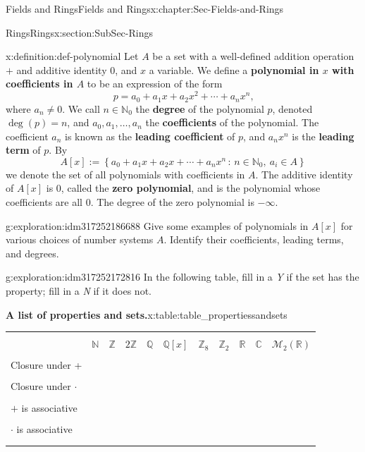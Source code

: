 \documentclass[oneside,10pt,]{book}
\newcommand{\tabularfont}{\relax}
\newcommand{\terminology}[1]{\textbf{#1}}
\numberwithin{equation}{section}
\newcommand{\hrulethin}  {\noalign{\hrule height 0.04em}}
\newcommand{\setof}[2]{{\left\{#1\,\colon\,#2\right\}}}
\def\C{{\mathbb C}}
\def\Z{{\mathbb Z}}
\def\Q{{\mathbb Q}}
\def\N{{\mathbb N}}
\def\R{{\mathbb R}}
\begin{document}
\begin{chapterptx}{Fields and Rings}{}{Fields and Rings}{}{}{x:chapter:Sec-Fields-and-Rings}
\begin{sectionptx}{Rings}{}{Rings}{}{}{x:section:SubSec-Rings}
\begin{definition}{}{x:definition:def-polynomial}%
Let \(A\) be a set with a well-defined addition operation \(+\) and additive identity \(0\), and \(x\) a variable. We define a \terminology{polynomial in \(x\) with coefficients in \(A\)} to be an expression of the form%
\begin{equation*}
p = a_0 + a_1 x + a_2 x^2 + \cdots + a_n x^n\text{,}
\end{equation*}
where \(a_n\ne 0\). We call \(n\in \N_0\) the \terminology{degree} of the polynomial \(p\), denoted \(\deg(p) = n\), and \(a_0,a_1,\ldots,
a_n\) the \terminology{coefficients} of the polynomial. The coefficient \(a_n\) is known as the \terminology{leading coefficient} of \(p\), and \(a_n x^n\) is the \terminology{leading term} of \(p\). By%
\begin{equation*}
A[x] := \setof{a_0 + a_1 x + a_2 x + \cdots + a_n x^n}{n\in \N_0, \ a_i\in A}
\end{equation*}
we denote the set of all polynomials with coefficients in \(A\). The additive identity of \(A[x]\) is \(0\), called the \terminology{zero polynomial}, and is the polynomial whose coefficients are all \(0\). The degree of the zero polynomial is \(-\infty\).%
\end{definition}
\begin{exploration}{}{g:exploration:idm317252186688}%
Give some examples of polynomials in \(A[x]\) for various choices of number systems \(A\). Identify their coefficients, leading terms, and degrees.%
\end{exploration}
\begin{exploration}{}{g:exploration:idm317252172816}%
In the following table, fill in a \emph{Y} if the set has the property; fill in a \emph{N} if it does not.%
\begin{tableptx}{\textbf{A list of properties and sets.}}{x:table:table_propertiessandsets}{}%
\centering
{\tabularfont%
\begin{tabular}{lllllllllll}
&&&&&&&&&&\tabularnewline\hrulethin
&\(\N\)&\(\Z\)&\(2\Z\)&\(\Q\)&\(\Q[x]\)&\(\Z_{8}\)&\(\Z_{2}\)&\(\R\)&\(\C\)&\(\mathcal{M}_2(\R)\)\tabularnewline[0pt]
&&&&&&&&&&\tabularnewline\hrulethin
Closure under +&&&&&&&&&&\tabularnewline[0pt]
&&&&&&&&&&\tabularnewline\hrulethin
Closure under \(\cdot\)&&&&&&&&&&\tabularnewline[0pt]
&&&&&&&&&&\tabularnewline\hrulethin
\(+\) is associative&&&&&&&&&&\tabularnewline[0pt]
&&&&&&&&&&\tabularnewline\hrulethin
\(\cdot\) is associative&&&&&&&&&&\tabularnewline[0pt]
&&&&&&&&&&\tabularnewline\hrulethin

\end{tabular}}
\end{tableptx}
\end{exploration}
\end{sectionptx}
\end{chapterptx}
\end{document}
